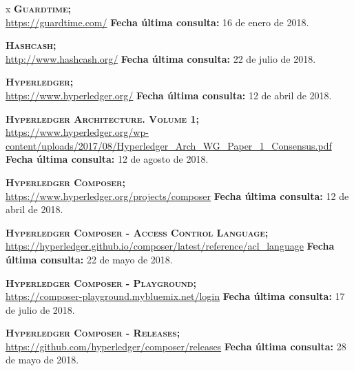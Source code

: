 \begin{thebibliography} {x}
	 \textsc{\textbf{Guardtime; }} \\ 
	\url{https://guardtime.com/}
	\newline \textbf{Fecha última consulta:} 16 de enero de 2018.
		
	 \textsc{\textbf{Hashcash; }} \\ 
	\url{http://www.hashcash.org/} 
	\newline \textbf{Fecha última consulta:} 22 de julio de 2018.
	
	 \textsc{\textbf{Hyperledger; }} \\ 
	\url{https://www.hyperledger.org/} 
	\newline \textbf{Fecha última consulta:} 12 de abril de 2018.

	 \textsc{\textbf{Hyperledger Architecture. Volume 1; }} \\ 
	\url{https://www.hyperledger.org/wp-content/uploads/2017/08/Hyperledger_Arch_WG_Paper_1_Consensus.pdf} 
	\newline \textbf{Fecha última consulta:} 12 de agosto de 2018.
	
	 \textsc{\textbf{Hyperledger Composer; }} \\ 
	\url{https://www.hyperledger.org/projects/composer} 
	\newline \textbf{Fecha última consulta:} 12 de abril de 2018.
	
	 \textsc{\textbf{Hyperledger Composer - Access Control Language; }} \\ 
	\url{https://hyperledger.github.io/composer/latest/reference/acl_language} 
	\newline \textbf{Fecha última consulta:} 22 de mayo de 2018.
		
	 \textsc{\textbf{Hyperledger Composer - Playground; }} \\ 
	\url{https://composer-playground.mybluemix.net/login} 
	\newline \textbf{Fecha última consulta:} 17 de julio de 2018.
	
	 \textsc{\textbf{Hyperledger Composer - Releases; }} \\ 
	\url{https://github.com/hyperledger/composer/releases} 
	\newline \textbf{Fecha última consulta:} 28 de mayo de 2018.
			

\end{thebibliography}

